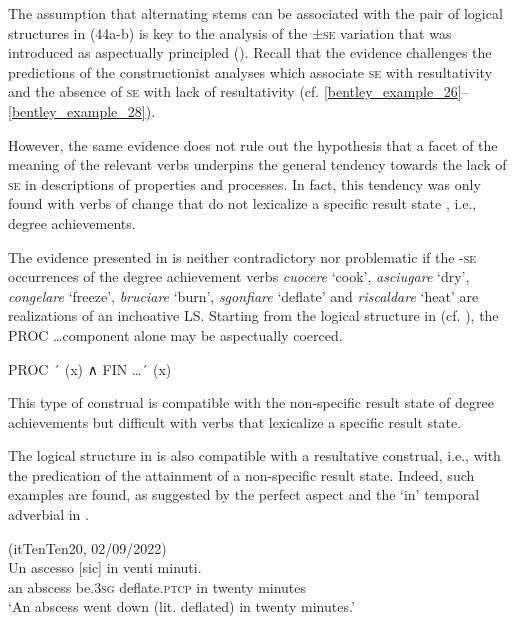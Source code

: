 \documentclass[output=paper,colorlinks,citecolor=brown
]{langscibook}
\begin{document}
The assumption that alternating stems can be associated with the pair of logical structures in (44a-b) is key to the analysis of the ±\textsc{se} variation that was introduced as aspectually principled (). Recall that the evidence challenges the predictions of the constructionist analyses which associate \textsc{se} with resultativity and the absence of \textsc{se} with lack of resultativity (cf. \ref{bentley_example_26}--\ref{bentley_example_28}). 

However, the same evidence does not rule out the hypothesis that a facet of the meaning of the relevant verbs underpins the general tendency towards the lack of \textsc{se} in descriptions of properties and processes. In fact, this tendency was only found with verbs of change that do not lexicalize a specific result state \citep{cennamo2012aspectual}, i.e., degree achievements. 

The evidence presented in  is neither contradictory nor problematic if the -\textsc{se} occurrences of the degree achievement verbs \textit{cuocere} ‘cook’, \textit{asciugare} ‘dry’, \textit{congelare} ‘freeze’, \textit{bruciare} ‘burn’, \textit{sgonfiare} ‘deflate’ and \textit{riscaldare} ‘heat’ are realizations of an inchoative LS. Starting from the logical structure in  (cf. ), the PROC \ldots  component alone may be aspectually coerced. 

\ea \label{bentley_example_48}
    PROC ´ (x) ∧ FIN  \ldots {}´ (x)
\z

This type of construal is compatible with the non-specific result state of degree achievements but difficult with verbs that lexicalize a specific result state. 

The logical structure in  is also compatible with a resultative construal, i.e., with the predication of the attainment of a non-specific result state. Indeed, such examples are found, as suggested by the perfect aspect and the ‘in’ temporal adverbial in .


\ea \label{bentley_example_49}(itTenTen20, 02/09/2022)\\
    \gll Un ascesso	{ [sic]} 						in venti 			minuti. \\
    an	abscess be.3\textsc{sg}		deflate.\textsc{ptcp}		in	twenty		minutes \\
    \glt ‘An abscess went down (lit. deflated) in twenty minutes.’
\z
\end{document}
